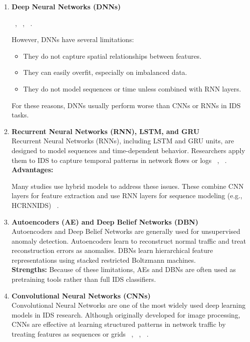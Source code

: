 \lipsum[2]
\begin{enumerate}
\item \textbf{Deep Neural Networks (DNNs)}

\lipsum[1] ~\cite{zamani2013machine}, ~\cite{alkasassbeh2018machine}, ~\cite{li2018machine}.

However, DNNs have several limitations:
\begin{itemize}
\item They do not capture spatial relationships between features.
\item They can easily overfit, especially on imbalanced data.
\item They do not model sequences or time unless combined with RNN layers.
\end{itemize}
For these reasons, DNNs usually perform worse than CNNs or RNNs in IDS tasks.


\item \textbf{Recurrent Neural Networks (RNN), LSTM, and GRU}\\
Recurrent Neural Networks (RNNs), including LSTM and GRU units, are designed to model sequences and time-dependent behavior. Researchers apply them to IDS to capture temporal patterns in network flows or logs ~\cite{khan2021hcrnnids}, ~\cite{javaid2016deep}.\\
\textbf{Advantages:}
\lipsum[2]

Many studies use hybrid models to address these issues. These combine CNN layers for feature extraction and use RNN layers for sequence modeling (e.g., HCRNNIDS) ~\cite{khan2021hcrnnids}.

\item \textbf{Autoencoders (AE) and Deep Belief Networks (DBN)}\\
Autoencoders and Deep Belief Networks are generally used for unsupervised anomaly detection. Autoencoders learn to reconstruct normal traffic and treat reconstruction errors as anomalies. DBNs learn hierarchical feature representations using stacked restricted Boltzmann machines.\\
\textbf{Strengths:}
\lipsum[2]
Because of these limitations, AEs and DBNs are often used as pretraining tools rather than full IDS classifiers.


\item \textbf{Convolutional Neural Networks (CNNs)}\\
Convolutional Neural Networks are one of the most widely used deep learning models in IDS research. Although originally developed for image processing, CNNs are effective at learning structured patterns in network traffic by treating features as sequences or grids ~\cite{wu2018novel}, ~\cite{naseer2018enhanced}, ~\cite{li2017intrusion}.


\end{enumerate}
